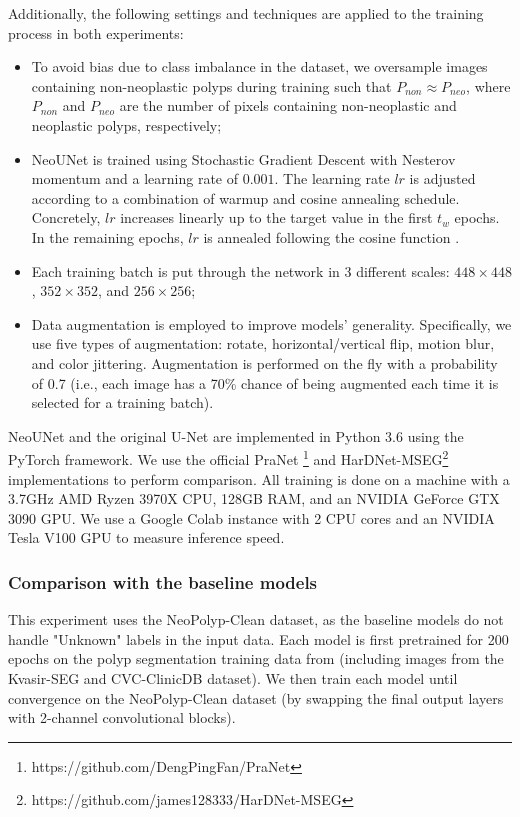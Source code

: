 \documentclass[runningheads]{llncs}
\newcommand{\ModelName}{NeoUNet\xspace}
\newcommand{\CleanDatasetName}{NeoPolyp-Clean\xspace}
\begin{document}
	Additionally, the following settings and techniques are applied to the training process in both experiments:
	\begin{itemize}
		\item To avoid bias due to class imbalance in the dataset, we oversample images containing non-neoplastic polyps during training such that $P_{non} \approx P_{neo}$, where $P_{non}$ and $P_{neo}$ are the number of pixels containing non-neoplastic and neoplastic polyps, respectively;
		\item \ModelName is trained using Stochastic Gradient Descent with Nesterov momentum and a learning rate of $0.001$. The learning rate $lr$ is adjusted according to a combination of warmup and cosine annealing schedule. Concretely, $lr$ increases linearly up to the target value in the first $t_w$ epochs. In the remaining epochs, $lr$ is annealed following the cosine function \cite{ilya2016sgdr}.
\item Each training batch is put through the network in 3 different scales: $448 \times 448$, $352 \times 352$, and $256 \times 256$;
		\item Data augmentation is employed to improve models' generality. Specifically, we use five types of augmentation: rotate, horizontal/vertical flip, motion blur, and color jittering. Augmentation is performed on the fly with a probability of 0.7 (i.e., each image has a 70\% chance of being augmented each time it is selected for a training batch).
	\end{itemize}



	\ModelName and the original U-Net are implemented in Python 3.6 using the PyTorch \cite{NEURIPS2019_9015} framework. We use the official PraNet \footnote{https://github.com/DengPingFan/PraNet} and HarDNet-MSEG\footnote{https://github.com/james128333/HarDNet-MSEG} implementations to perform comparison. All training is done on a machine with a 3.7GHz AMD Ryzen 3970X CPU, 128GB RAM, and an NVIDIA GeForce GTX 3090 GPU. We use a Google Colab instance with 2 CPU cores and an NVIDIA Tesla V100 GPU to measure inference speed.

	\subsubsection{Comparison with the baseline models}
	This experiment uses the \CleanDatasetName dataset, as the baseline models do not handle "Unknown" labels in the input data. Each model is first pretrained for 200 epochs on the polyp segmentation training data from \cite{jha2019resunet++} (including images from the Kvasir-SEG and CVC-ClinicDB dataset). We then train each model until convergence on the \CleanDatasetName dataset (by swapping the final output layers with 2-channel convolutional blocks).
\end{document}
